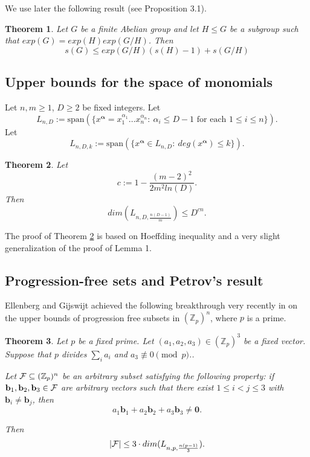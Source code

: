 \documentclass[12pt]{article}
\newtheorem{thm}{Theorem}[section]
\newcommand{\proof
}{\par\medskip\noindent {\bf Proof.\ \ }}
\newcommand{\Zp}{\mathbb Z _p}
\newcommand{\cF}{\mbox{$\cal F$}}
\newcommand{\ve}[1]{\mathbf{#1}}
\begin{document}
We use later the following result (see \cite{CDGGS} Proposition 3.1).
\begin{thm} \label{exp_upper}
Let $G$ be a finite Abelian group and let $H\leq G$ be a subgroup such that $exp(G)=exp(H)exp(G/H)$. Then
$$
s(G)\leq exp(G/H)(s(H)-1)+s(G/H)
$$
\end{thm}


\subsection{Upper bounds for the space of monomials}


Let $n,m\geq 1$, $D\geq 2$ be fixed integers. Let 
$$
L_{n,D}:=\mbox{span}(\{x^{\ve\alpha}=x_1^{\alpha_1}\ldots x_n^{\alpha_n}:~{\alpha_i\leq D-1} \mbox{ for each } 1\leq i\leq n\} ).
$$
Let 
$$
L_{n,D,k}:=\mbox{span}(\{x^{\ve\alpha}\in L_{n,D}  :~ deg(x^{\ve\alpha})\leq k \}).
$$
\begin{thm} \label{upper33}
Let 
$$
c:=1-\frac{(m-2)^2}{2 m^2ln(D)}.
$$
Then 
$$
dim(L_{n,D,\frac{n(D-1)}{m}})\leq D^{cn}.
$$
\end{thm}
The proof of Theorem \ref{upper33} is based on Hoeffding inequality and a very slight generalization of the proof of \cite{G} Lemma 1. 


\subsection{Progression-free sets and Petrov's result}

Ellenberg and Gijswijt achieved the following breakthrough very recently in \cite{EG} on the upper bounds of progression free subsets in $({\Zp})^n$, where $p$ is a prime.

\begin{thm} \label{main55}
Let $p$ be a fixed prime.
Let $(a_1,a_2 ,a_3)\in ({\Zp})^3$ be  a fixed vector. Suppose that 
$p$ divides $\sum_i a_i$ and  $a_3\not\equiv 0 \pmod p$.. 

Let $\cF\subseteq ({\Zp})^n$ be an arbitrary  subset satisfying the following property:   if $\ve b_1, \ve b_2, \ve b_3\in {\cF}$ are arbitrary vectors such that 
there exist $1\leq i<j\leq 3$ with $\ve b_i\ne \ve b_j$, then
$$
a_1\ve b_1+ a_2\ve b_2+ a_3\ve b_3\ne \ve 0.
$$


Then 
$$
|\cF|\leq 3 \cdot dim(L_{n,p,\frac{n(p-1)}{3}}).
$$
\end{thm}
\end{document}
